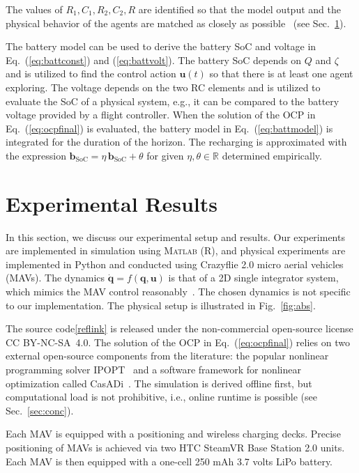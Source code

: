 \documentclass[letterpaper,10pt,conference,twoside]{IEEEtran}
\theoremstyle{definition}
\begin{document}
The values of $R_1,C_1,R_2,C_2,R$ are identified so that the model output and the physical behavior of the agents are matched as closely as possible~\cite{zhao2017observability} (see Sec.~\ref{sec:res}).

The battery model %
can be used to derive the battery SoC and voltage in Eq.~(\ref{eq:battconst}) and (\ref{eq:battvolt}). The battery SoC depends on $Q$ and $\zeta$ and is utilized to find the control action $\mathbf{u}(t)$ so that there is at least one agent exploring. %
The voltage depends on the two RC elements and is utilized to evaluate the SoC of a physical system, e.g., it can be compared to the battery voltage provided by a flight controller. 
When the solution of the OCP in Eq.~(\ref{eq:ocpfinal}) is evaluated, the battery model in Eq.~(\ref{eq:battmodel}) is integrated for the duration of the horizon. The recharging is approximated with the expression $\mathbf{b}_{\text{SoC}}=\eta\,\mathbf{b}_{\text{SoC}}+\theta$ for given $\eta,\theta\in\mathbb{R}$ determined empirically.


\section{Experimental Results}\label{sec:res}
\noindent
In this section, we discuss our experimental setup and results. Our experiments are implemented in simulation using  \textsc{Matlab} (R), and physical experiments  are implemented in Python and conducted using Crazyflie 2.0 micro aerial vehicles (MAVs). 
The dynamics $\dot{\mathbf{q}}=f(\mathbf{q},\mathbf{u})$ is that of a 2D single integrator system, which mimics the MAV control reasonably~\cite{dong2023time}. The chosen dynamics is not specific to our implementation. The physical setup is illustrated in Fig.~\ref{fig:abs}.

The source code\cref{reflink} is released under the %
non-commercial open-source license CC BY-NC-SA~4.0. The solution of the OCP in Eq.~(\ref{eq:ocpfinal}) relies on two external open-source components from the literature: the popular nonlinear programming solver IPOPT~\cite{wachter2006implementation} and a software framework for nonlinear optimization called CasADi~\cite{andersson2012casadi}. The simulation is derived offline first, but computational load is not prohibitive, i.e., online runtime is possible (see Sec.~\ref{sec:conc}).

Each MAV is equipped with a positioning and wireless charging decks. Precise positioning of MAVs is achieved via two HTC SteamVR Base Station 2.0 units. Each MAV is then equipped with a one-cell 250 mAh 3.7 volts LiPo battery.%
\end{document}
